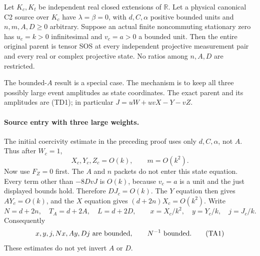 \label{p6c62a53b1454:sec:c2-three-large}

\begin{theorem}
\label{p6c62a53b1454:thm:c2-three-large}
Let $K_c,K_t$ be independent real closed extensions of $\mathbb R$.
Let a physical canonical C2 source over $K_c$ have $\lambda=\beta=0$,
with $d,C,\alpha$ positive bounded units and
$n,m,A,D\geq0$ arbitrary. Suppose an actual finite noncommuting
stationary zero has $u_c=k>0$ infinitesimal and $v_c=a>0$ a bounded
unit. Then the entire original parent is tensor SOS at every
independent projective measurement pair and every real or complex
projective state. No ratios among $n,A,D$ are restricted.
\end{theorem}

The bounded-$A$ result is a special case. The mechanism is to keep
all three possibly large event amplitudes as state coordinates.
The exact parent and its amplitudes are (TD1); in particular
$J=uW+uvX-Y-vZ$.

\paragraph{Source entry with three large weights.}
The initial coercivity estimate in the preceding proof uses only
$d,C,\alpha$, not $A$. Thus after $W_c=1$,
\[
 X_c,Y_c,Z_c=O(k),\qquad m=O(k^2).
\]
Now use $F_Z=0$ first. The $A$ and $n$ packets do not enter this
state equation. Every term other than $-8DvJ$ is $O(k)$, because
$v_c=a$ is a unit and the just displayed bounds hold. Therefore
$DJ_c=O(k)$. The $Y$ equation then gives $AY_c=O(k)$, and the $X$
equation gives $(d+2n)X_c=O(k^2)$. Write
\[
 N=d+2n,\quad T_A=d+2A,\quad L=d+2D,\qquad
 x=X_c/k^2,\quad y=Y_c/k,\quad j=J_c/k.
\]
Consequently
\[
 x,y,j,Nx,Ay,Dj\ \hbox{are bounded},\qquad N^{-1}\ \hbox{bounded}.
                                                               \tag{TA1}
\]
These estimates do not yet invert $A$ or $D$.

